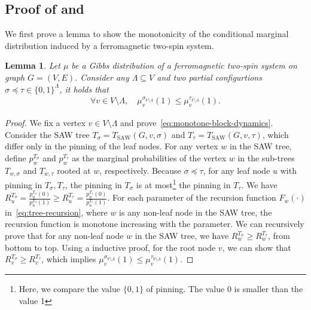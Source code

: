 \documentclass[11pt]{amsart}
\newtheorem{lemma}[theorem]{Lemma}
\theoremstyle{definition}
\theoremstyle{remark}
\begin{document}
\subsection{Proof of \texorpdfstring{}{Proposition 29} and \texorpdfstring{}{Proposition 30}}
We first prove a lemma to show the monotonicity of the conditional marginal distribution induced by a ferromagnetic two-spin system.
\begin{lemma}\label{lemma:monotone-glauber-dynamics}
Let $\mu$ be a Gibbs distribution of a ferromagnetic two-spin system on graph $G = (V,E)$. Consider any $\Lambda\subseteq V$ and two 
partial configurtions $\sigma\preceq \tau\in \{0,1\}^{\Lambda}$, it holds that
\begin{align}\label{eq:monotone-block-dynamics}
\forall v\in V\setminus \Lambda, \quad \mu_v^{\sigma_{V\setminus \Lambda}}(1) \leq \mu_v^{\tau_{V\setminus \Lambda}}(1).
\end{align}
\end{lemma}
\begin{proof}%
We fix a vertex $v\in V\setminus \Lambda$ and prove~\eqref{eq:monotone-block-dynamics}. Consider the SAW tree $T_{\sigma}=T_{\text{SAW}}(G,v,\sigma)$ and $T_{\tau}=T_{\text{SAW}}(G,v,\tau)$, which differ only in the pinning of the leaf nodes.
For any vertex $w$ in the SAW tree, define $p_w^{T_{\sigma}}$ and $p_w^{T_{\tau}}$ as the marginal probabilities of the vertex $w$ in the sub-trees $T_{w,\sigma}$ and $T_{w,\tau}$ rooted at $w$, respectively. Because $\sigma\preceq \tau$, for any leaf node $u$ with pinning in $T_{\sigma},T_{\tau}$, the pinning in $T_{\sigma}$ is at most\footnote{Here, we compare the value $\{0,1\}$ of pinning. The value 0 is smaller than the value 1} the pinning in $T_{\tau}$.
We have $R_u^{T_{\sigma}}=\frac{p_u^{T_{\sigma}}(0)}{p_u^{T_{\sigma}}(1)}\geq R_u^{T_{\tau}}=\frac{p_u^{T_{\tau}}(0)}{p_u^{T_{\tau}}(1)}$. For each parameter of the recursion function $F_w(\cdot)$ in~\eqref{eq:tree-recursion}, where $w$ is any non-leaf node in the SAW tree, the recursion function is monotone increasing with the parameter. We can recursively prove that for any non-leaf node $w$ in the SAW tree, we have $R_w^{T_{\sigma}}\geq R_w^{T_{\tau}}$, from bottom to top. Using a inductive proof, for the root node $v$, we can show that $R_v^{T_{\sigma}}\geq R_v^{T_{\tau}}$, which implies $\mu_v^{\sigma_{V\setminus \Lambda}}(1) \leq \mu_v^{\tau_{V\setminus \Lambda}}(1)$. 
\end{proof}
\end{document}
